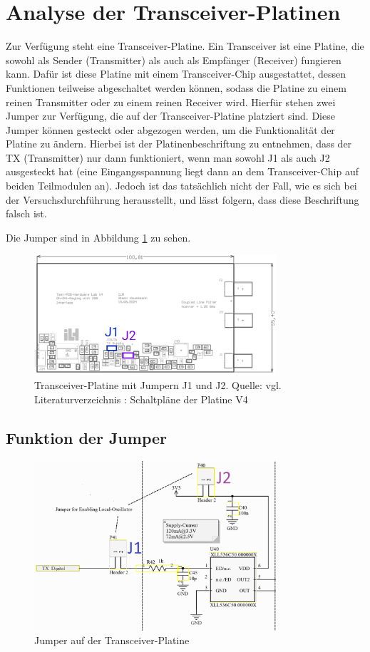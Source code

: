 \section{Analyse der Transceiver-Platinen}
Zur Verfügung steht eine Transceiver-Platine. Ein Transceiver ist eine Platine, die sowohl als Sender (Transmitter) als auch als Empfänger (Receiver) fungieren kann. Dafür ist diese Platine mit einem Transceiver-Chip ausgestattet, dessen Funktionen teilweise abgeschaltet werden können, sodass die Platine zu einem reinen Transmitter oder zu einem reinen Receiver wird.  
Hierfür stehen zwei Jumper zur Verfügung, die auf der Transceiver-Platine platziert sind. Diese Jumper können gesteckt oder abgezogen werden, um die Funktionalität der Platine zu ändern. Hierbei ist der Platinenbeschriftung zu entnehmen, dass der TX (Transmitter) nur dann funktioniert, wenn man sowohl J1 als auch J2 ausgesteckt hat (eine Eingangsspannung liegt dann an dem Transceiver-Chip auf beiden Teilmodulen an). Jedoch ist das tatsächlich nicht der Fall,
wie es sich bei der Versuchsdurchführung herausstellt, und lässt folgern, dass diese Beschriftung falsch ist.

Die Jumper sind in Abbildung \ref{fig:Tranceiver-Platine} zu sehen.
\begin{figure}[H]
    \centering
    \includegraphics[width=0.8\textwidth]{Pictures/Jumper.jpg}
    \caption{Transceiver-Platine mit Jumpern J1 und J2. Quelle: vgl. Literaturverzeichnis \cite{SchaltplanPCBV4}: Schaltpläne der Platine V4}
    \label{fig:Tranceiver-Platine}
\end{figure}
\subsection{Funktion der Jumper}
\begin{figure}[H]
    \centering
    \includegraphics[width=0.8\textwidth]{Pictures/JumperSchaltung.png}
    \caption{Jumper auf der Transceiver-Platine}
    \label{fig:Jumper}
\end{figure}
